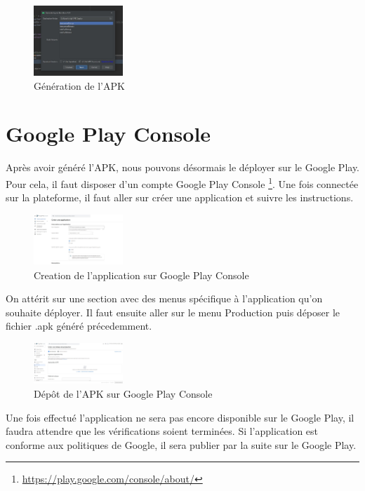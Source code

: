 \documentclass[UTF8]{EPURapport}
\begin{document}
\begin{figure}[h!]
\centering
  \includegraphics[width=0.3\textwidth]{images/generateAPK.jpg}
  \caption{Génération de l'APK}
  \label{fig:genapk}
\end{figure}

\section{Google Play Console}

Après avoir généré l'APK, nous pouvons désormais le déployer sur le Google Play. Pour cela, il faut disposer d'un compte Google Play Console \footnote{\url{https://play.google.com/console/about/}}. Une fois connectée sur la plateforme, il faut aller sur créer une application et suivre les instructions.

\begin{figure}[h!]
\centering
  \includegraphics[width=0.3\textwidth]{images/CreateAppConsole.JPG}
  \caption{Creation de l'application sur Google Play Console}
  \label{fig:createappconsole}
\end{figure}

On attérit sur une section avec des menus spécifique à l'application qu'on souhaite déployer. Il faut ensuite aller sur le menu Production puis déposer le fichier .apk généré précedemment.

\begin{figure}[h!]
\centering
  \includegraphics[width=0.3\textwidth]{images/release.JPG}
  \caption{Dépôt de l'APK sur Google Play Console}
  \label{fig:depotapk}
\end{figure}

Une fois effectué l'application ne sera pas encore disponible sur le Google Play, il faudra attendre que les vérifications soient terminées. Si l'application est conforme aux politiques de Google, il sera publier par la suite sur le Google Play.
\end{document}
